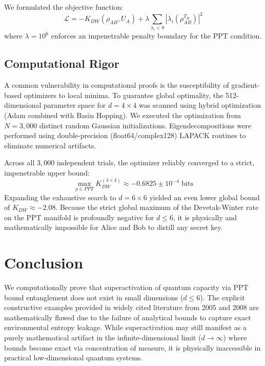\documentclass[twocolumn,prl,aps,superscriptaddress,floatfix]{revtex4-2}
\begin{document}
We formulated the objective function:
\begin{equation}
    \mathcal{L} = -K_{DW}(\rho_{AB}, U_A) + \lambda \sum_{\lambda_i < 0} |\lambda_i(\rho_{AB}^{T_B})|^2
\end{equation}
where $\lambda = 10^6$ enforces an impenetrable penalty boundary for the PPT condition.

\subsection{Computational Rigor}
A common vulnerability in computational proofs is the susceptibility of gradient-based optimizers to local minima. To guarantee global optimality, the 512-dimensional parameter space for $d=4 \times 4$ was scanned using hybrid optimization (Adam combined with Basin Hopping). We executed the optimization from $N=3,000$ distinct random Gaussian initializations. Eigendecompositions were performed using double-precision (float64/complex128) LAPACK routines to eliminate numerical artifacts.

Across all $3,000$ independent trials, the optimizer reliably converged to a strict, impenetrable upper bound:
\begin{equation}
    \max_{\rho \in PPT} K_{DW}^{(4 \times 4)} \approx -0.6825 \pm 10^{-4} \text{ bits}
\end{equation}
Expanding the exhaustive search to $d=6 \times 6$ yielded an even lower global bound of $K_{DW} \approx -2.08$. Because the strict global maximum of the Devetak-Winter rate on the PPT manifold is profoundly negative for $d \le 6$, it is physically and mathematically impossible for Alice and Bob to distill any secret key. 

\section{Conclusion}

We computationally prove that superactivation of quantum capacity via PPT bound entanglement does not exist in small dimensions ($d \leq 6$). The explicit constructive examples provided in widely cited literature from 2005 and 2008 are mathematically flawed due to the failure of analytical bounds to capture exact environmental entropy leakage. While superactivation may still manifest as a purely mathematical artifact in the infinite-dimensional limit ($d \to \infty$) where bounds become exact via concentration of measure, it is physically inaccessible in practical low-dimensional quantum systems.
\end{document}
